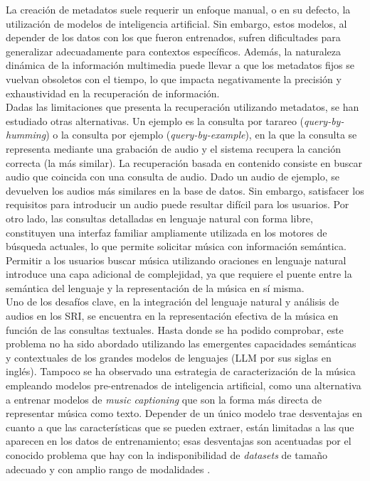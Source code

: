 La creación de metadatos suele requerir un enfoque manual, o en su defecto, la utilización de modelos de inteligencia artificial. Sin embargo, estos modelos, al depender de los datos con los que fueron entrenados, sufren dificultades para generalizar adecuadamente para contextos específicos. Además, la naturaleza dinámica de la información multimedia puede llevar a que los metadatos fijos se vuelvan obsoletos con el tiempo, lo que impacta negativamente la precisión y exhaustividad en la recuperación de información. \\ %
Dadas las limitaciones que presenta la recuperación utilizando metadatos, se han estudiado otras alternativas. Un ejemplo es la consulta por tarareo (\textit{query-by-humming}) o la consulta por ejemplo (\textit{query-by-example}), en la que la consulta se representa mediante una grabación de audio y el sistema recupera la canción correcta (la más similar). La recuperación basada en contenido consiste en buscar audio que coincida con una consulta de audio. Dado un audio de ejemplo, se devuelven los audios más similares en la base de datos. Sin embargo, satisfacer los requisitos para introducir un audio puede resultar difícil para los usuarios. Por otro lado, las consultas detalladas en lenguaje natural con forma libre, constituyen una interfaz familiar ampliamente utilizada en los motores de búsqueda actuales, lo que permite solicitar música con información semántica.\\
Permitir a los usuarios buscar música utilizando oraciones en lenguaje natural introduce una capa adicional de complejidad, ya que requiere el puente entre la semántica del lenguaje y la representación de la música en sí misma.\\
Uno de los desafíos clave, en la integración del lenguaje natural y análisis de audios en los SRI, se encuentra en la representación efectiva de la música en función de las consultas textuales. Hasta donde se ha podido comprobar, este problema no ha sido abordado utilizando las emergentes capacidades semánticas y contextuales de los grandes modelos de lenguajes (LLM por sus siglas en inglés). Tampoco se ha observado una estrategia de caracterización de la música empleando modelos pre-entrenados de inteligencia artificial, como una alternativa a entrenar modelos de \textit{music captioning} que son la forma más directa de representar música como texto. Depender de un único modelo trae desventajas en cuanto a que las características que se pueden extraer, están limitadas a las que aparecen en los datos de entrenamiento; esas desventajas son acentuadas por el conocido problema que hay con la indisponibilidad de \textit{datasets} de tamaño adecuado y con amplio rango de modalidades \cite{Simonetta2019MultimodalMI}. \\ 
